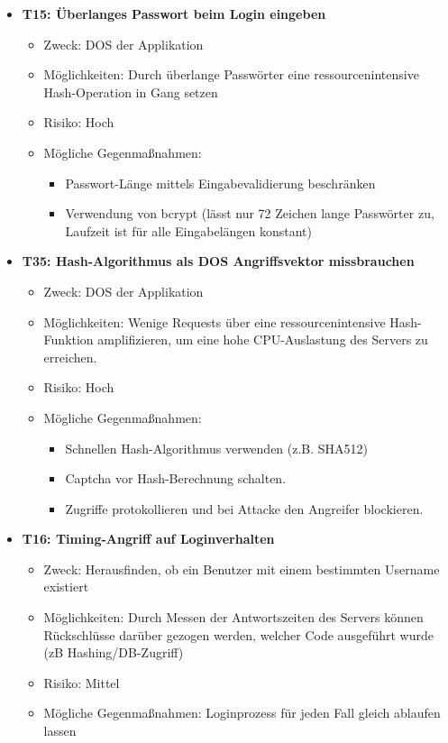 \documentclass[12pt,DIV14,BCOR10mm,a4paper,parskip=half-,headsepline,headinclude,english,ngerman,bibliography=totocnumbered]{scrreprt}
\begin{document}
\begin{itemize}

  \hypertarget{threat15}{}
  \item \textbf{T15: Überlanges Passwort beim Login eingeben}
  \begin{itemize}
  \item Zweck: DOS der Applikation
  \item Möglichkeiten: Durch überlange Passwörter eine ressourcenintensive Hash-Operation in Gang setzen
  \item Risiko: Hoch
  \item Mögliche Gegenmaßnahmen:
  \begin{itemize}
  \item Passwort-Länge mittels Eingabevalidierung beschränken
  \item Verwendung von bcrypt (lässt nur 72 Zeichen lange Passwörter zu, Laufzeit ist für alle Eingabelängen konstant)
  \end{itemize}
\end{itemize}

  \hypertarget{threat35}{}
  \item \textbf{T35: Hash-Algorithmus als DOS Angriffsvektor missbrauchen}
  \begin{itemize}
  \item Zweck: DOS der Applikation
  \item Möglichkeiten: Wenige Requests über eine ressourcenintensive Hash-Funktion amplifizieren, um eine hohe CPU-Auslastung des Servers zu erreichen.
  \item Risiko: Hoch
  \item Mögliche Gegenmaßnahmen:
  \begin{itemize}
  \item Schnellen Hash-Algorithmus verwenden (z.B. SHA512)
  \item Captcha vor Hash-Berechnung schalten.
  \item Zugriffe protokollieren und bei Attacke den Angreifer blockieren.
  \end{itemize}
\end{itemize}

  \hypertarget{threat16}{}
  \item \textbf{T16: Timing-Angriff auf Loginverhalten}
  \begin{itemize}
  \item Zweck: Herausfinden, ob ein Benutzer mit einem bestimmten Username existiert
  \item Möglichkeiten: Durch Messen der Antwortszeiten des Servers können Rückschlüsse darüber gezogen werden, welcher Code ausgeführt wurde (zB Hashing/DB-Zugriff)
  \item Risiko: Mittel
  \item Mögliche Gegenmaßnahmen: Loginprozess für jeden Fall gleich ablaufen lassen
  \end{itemize}


\end{itemize}
\end{document}
